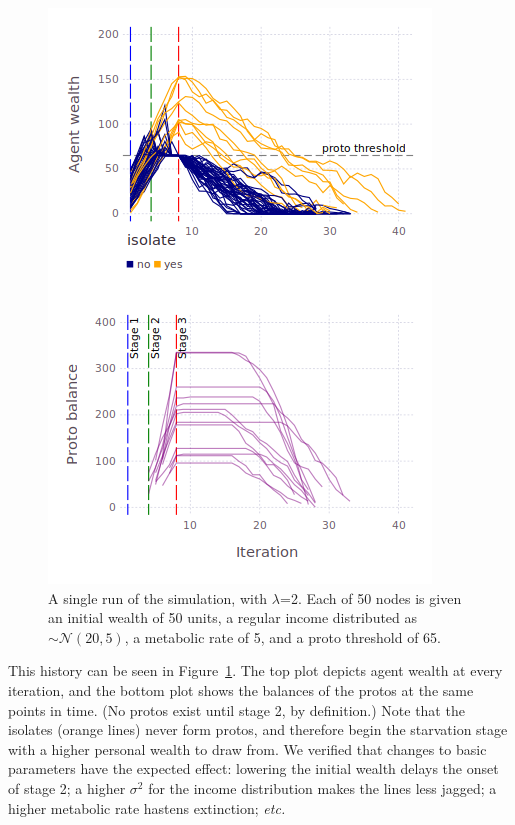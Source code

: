 \begin{figure}[ht]
\centering
\includegraphics[width=\columnwidth]{figures/sampleLifeHistory.png}
\caption{A single run of the simulation, with $\lambda$=2. Each of 50 nodes is
given an initial wealth of 50 units, a regular income distributed as
$\sim\mathcal{N}(20,5)$, a metabolic rate of 5, and a proto threshold of 65.}
\label{fig:singleRun}
\end{figure}

This history can be seen in Figure~\ref{fig:singleRun}. The top plot depicts
agent wealth at every iteration, and the bottom plot shows the balances of the
protos at the same points in time. (No protos exist until stage 2, by
definition.) Note that the isolates (orange lines) never form protos, and
therefore begin the starvation stage with a higher personal wealth to draw
from. We verified that changes to basic parameters have the expected effect:
lowering the initial wealth delays the onset of stage 2; a higher $\sigma^2$
for the income distribution makes the lines less jagged; a higher metabolic
rate hastens extinction; \textit{etc.}


